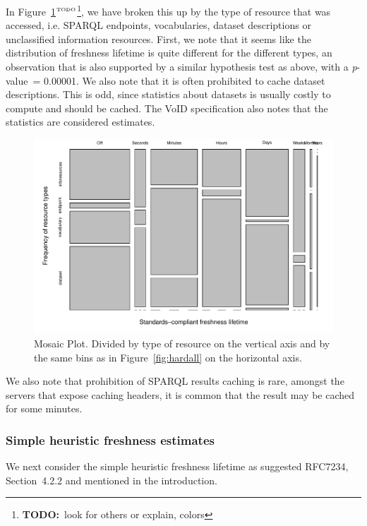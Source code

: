 \documentclass{llncs}
\newcommand{\pvalue}{\textit{p}-value\ }
\newcommand{\todo}[1]{\ensuremath{^{\textrm{\tiny{TODO}\normalsize}}}\footnote{\textbf{TODO:}~#1}}
\begin{document}
In Figure~\ref{fig:hardtable}\todo{look for others or explain, colors}, we have broken this
up by the type of resource that was accessed, i.e. SPARQL endpoints,
vocabularies, dataset descriptions or unclassified information
resources. First, we note that it seems like the distribution of
freshness lifetime is quite different for the different types, an
observation that is also supported by a similar hypothesis test as
above, with a \pvalue = 0.00001. We also note that it is often
prohibited to cache dataset descriptions. This is odd, since
statistics about datasets is usually costly to compute and should be
cached. The VoID specification \cite{voidnote} also notes that the
statistics are considered estimates.

\begin{figure}[ht]
  \centerline{%
    \includegraphics[width=.9\textwidth]{hardtable.pdf}}
  \caption{Mosaic Plot. Divided by type of resource on the vertical
    axis and by the same bins as in Figure~\ref{fig:hardall} on the
    horizontal axis. }
  \label{fig:hardtable}
\end{figure}


We also note that prohibition of SPARQL results caching is rare,
amongst the servers that expose caching headers, it is common
that the result may be cached for some minutes.

\subsubsection{Simple heuristic freshness estimates}\label{sec:simplefresh}

We next consider the simple heuristic freshness lifetime as suggested
RFC7234, Section~4.2.2 and mentioned in the introduction.
\end{document}
